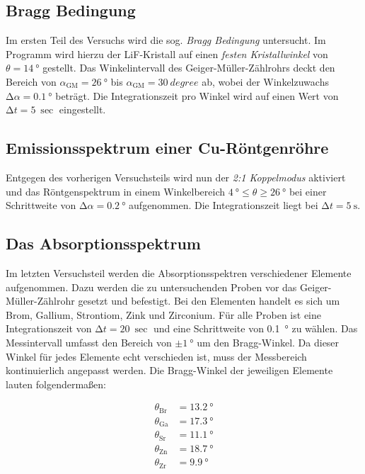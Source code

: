 \subsection{Bragg Bedingung}

Im ersten Teil des Versuchs wird die sog. \emph{Bragg Bedingung} untersucht. Im Programm wird hierzu der LiF-Kristall auf einen \emph{festen Kristallwinkel} von 
$\theta = \qty{14}{\degree}$ gestellt. Das Winkelintervall des Geiger-Müller-Zählrohrs deckt den Bereich von $\alpha_\text{GM} = \qty{26}{\degree}$ bis 
$\alpha_\text{GM} = \qty{30}{degree}$ ab, wobei der Winkelzuwachs $\increment\alpha = \qty{0.1}{\degree}$ beträgt. Die Integrationszeit pro Winkel wird auf einen 
Wert von $\increment{}t = \qty{5}{\sec}$ eingestellt.

\subsection{Emissionsspektrum einer Cu-Röntgenröhre}

Entgegen des vorherigen Versuchsteils wird nun der \emph{2:1 Koppelmodus} aktiviert und das Röntgenspektrum in einem Winkelbereich 
$\qty{4}{\degree} \leq \theta \geq \qty{26}{\degree}$ bei einer Schrittweite von $\increment\alpha = \qty{0.2}{\degree}$ aufgenommen. Die Integrationszeit liegt 
bei $\increment{}t = \qty{5}{\second}$.

\subsection{Das Absorptionsspektrum}

Im letzten Versuchsteil werden die Absorptionsspektren verschiedener Elemente aufgenommen. Dazu werden die zu untersuchenden Proben vor das Geiger-Müller-Zählrohr 
gesetzt und befestigt. Bei den Elementen handelt es sich um Brom, Gallium, Strontiom, Zink und Zirconium. Für alle Proben ist eine Integrationszeit von 
$\increment{}t = \qty{20}{\sec}$ und eine Schrittweite von \qty{0.1}{\degree} zu wählen. Das Messintervall umfasst den Bereich von $\pm\qty{1}{\degree}$ um 
den Bragg-Winkel. Da dieser Winkel für jedes Elemente echt verschieden ist, muss der Messbereich kontinuierlich angepasst werden. Die Bragg-Winkel der jeweiligen 
Elemente lauten folgendermaßen:

\begin{align*}
    \theta_\text{Br} &= \qty{13.2}{\degree} \\
    \theta_\text{Ga} &= \qty{17.3}{\degree} \\  
    \theta_\text{Sr} &= \qty{11.1}{\degree} \\  
    \theta_\text{Zn} &= \qty{18.7}{\degree} \\  
    \theta_\text{Zr} &= \qty{9.9}{\degree} \\  
\end{align*}

